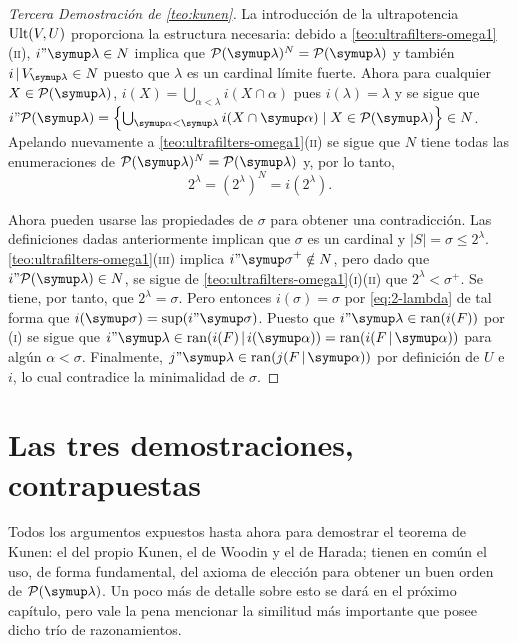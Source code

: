 \documentclass
[
  12pt,
  letterpaper,
  openany,
  oneside,
]{book}
\begin{document}
\begin{proof}[Tercera Demostración de \ref{teo:kunen}]
    La introducción de la ultrapotencia $\operatorname{Ult}(V, U)$ proporciona la estructura necesaria:
    debido a \ref{teo:ultrafilters-omega1}(\textsc{ii}), $i"\lambda\in N$ implica que
    $\pwset{\lambda}^N = \pwset{\lambda}$ y también $i\rest V_\lambda\in N$ puesto que
    $\lambda$ es un cardinal límite fuerte. Ahora para cualquier $X\in\pwset{\lambda}$,
    $i(X) = \bigcup_{\alpha<\lambda} i(X\cap\alpha)$ pues $i(\lambda)=\lambda$ y se sigue
    que $i"\pwset{\lambda} = \set{\bigcup_{\alpha<\lambda} i(X\cap\alpha)\mid
    X\in\pwset{\lambda}}\in N$. Apelando nuevamente a \ref{teo:ultrafilters-omega1}(\textsc{ii})
    se sigue que $N$ tiene todas las enumeraciones de $\pwset{\lambda}^N=\pwset{\lambda}$ y,
    por lo tanto,
    \begin{equation}\label{eq:2-lambda}
        2^\lambda = (2^\lambda)^N = i(2^\lambda).
    \end{equation}

    Ahora pueden usarse las propiedades de $\sigma$ para obtener una contradicción.
    Las definiciones dadas anteriormente implican que $\sigma$ es un cardinal y
    $|S|=\sigma\leq 2^\lambda$. \ref{teo:ultrafilters-omega1}(\textsc{iii}) implica
    $i"\sigma^+\notin N$, pero dado que $i"\pwset{\lambda}\in N$, se sigue de
    \ref{teo:ultrafilters-omega1}(\textsc{i})(\textsc{ii}) que $2^\lambda<\sigma^+$.
    Se tiene, por tanto, que $2^\lambda = \sigma$. Pero entonces
    $i(\sigma)=\sigma$ por \ref{eq:2-lambda} de tal forma que $i(\sigma)=\sup(i"\sigma)$.
    Puesto que $i"\lambda\in\ran(i(F))$ por (\textsc{i})
    se sigue que $i"\lambda\in\ran(i(F)\rest i(\alpha)) = \ran(i(F\rest\alpha))$ para algún
    $\alpha<\sigma$. Finalmente, $j"\lambda\in\ran(j(F\rest\alpha))$ por definición de $U$
    e $i$, lo cual contradice la minimalidad de $\sigma$.
\end{proof}

\section{Las tres demostraciones, contrapuestas}

Todos los argumentos expuestos hasta ahora para demostrar el teorema de Kunen:
el del propio Kunen, el de Woodin y el de Harada; tienen en común el uso,
de forma fundamental, del axioma de elección para obtener un buen orden
de $\pwset{\lambda}$. Un poco más de detalle sobre esto se dará en el próximo
capítulo, pero vale la pena mencionar la similitud más importante
que posee dicho trío de razonamientos.
\end{document}
